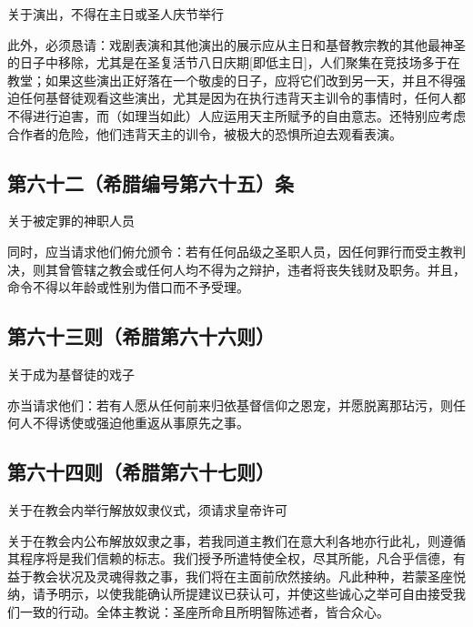 关于演出，不得在主日或圣人庆节举行\par

此外，必须恳请：戏剧表演和其他演出的展示应从主日和基督教宗教的其他最神圣的日子中移除，尤其是在圣复活节八日庆期[即低主日]，人们聚集在竞技场多于在教堂；如果这些演出正好落在一个敬虔的日子，应将它们改到另一天，并且不得强迫任何基督徒观看这些演出，尤其是因为在执行违背天主训令的事情时，任何人都不得进行迫害，而（如理当如此）人应运用天主所赋予的自由意志。还特别应考虑合作者的危险，他们违背天主的训令，被极大的恐惧所迫去观看表演。\par


\subsection{第六十二（希腊编号第六十五）条}

关于被定罪的神职人员\par

同时，应当请求他们俯允颁令：若有任何品级之圣职人员，因任何罪行而受主教判决，则其曾管辖之教会或任何人均不得为之辩护，违者将丧失钱财及职务。并且，命令不得以年龄或性别为借口而不予受理。\par


\subsection{第六十三则（希腊第六十六则）}

关于成为基督徒的戏子\par

亦当请求他们：若有人愿从任何前来归依基督信仰之恩宠，并愿脱离那玷污，则任何人不得诱使或强迫他重返从事原先之事。\par


\subsection{第六十四则（希腊第六十七则）}

关于在教会内举行解放奴隶仪式，须请求皇帝许可\par

关于在教会内公布解放奴隶之事，若我同道主教们在意大利各地亦行此礼，则遵循其程序将是我们信赖的标志。我们授予所遣特使全权，尽其所能，凡合乎信德，有益于教会状况及灵魂得救之事，我们将在主面前欣然接纳。凡此种种，若蒙圣座悦纳，请予明示，以使我能确认所提建议已获认可，并使这些诚心之举可自由接受我们一致的行动。全体主教说：圣座所命且所明智陈述者，皆合众心。\par

